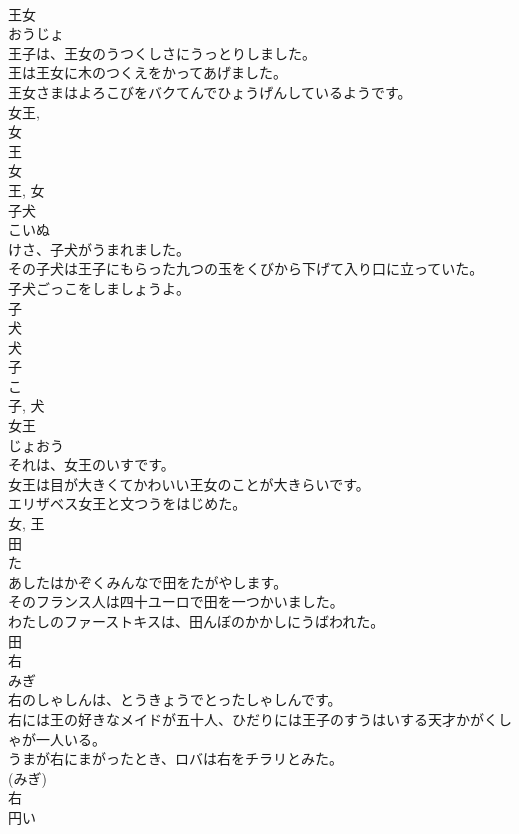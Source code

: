 \documentclass[8pt]{extreport}
\begin{document}
\begin{CJK}{UTF8}{min}
\\	王女	
\\	おうじょ	
\\	王子は、王女のうつくしさにうっとりしました。	
\\	王は王女に木のつくえをかってあげました。	
\\	王女さまはよろこびをバクてんでひょうげんしているようです。	
\\	女王, 
\\	女 
\\	王 
\\	女 
\\	王, 女	
\\	子犬	
\\	こいぬ	
\\	けさ、子犬がうまれました。	
\\	その子犬は王子にもらった九つの玉をくびから下げて入り口に立っていた。	
\\	子犬ごっこをしましょうよ。	
\\	子 
\\	犬 
\\	犬 
\\	子 
\\	こ 
\\	子, 犬	
\\	女王	
\\	じょおう	
\\	それは、女王のいすです。	
\\	女王は目が大きくてかわいい王女のことが大きらいです。	
\\	エリザベス女王と文つうをはじめた。	
\\	女, 王	
\\	田	
\\	た	
\\	あしたはかぞくみんなで田をたがやします。	
\\	そのフランス人は四十ユーロで田を一つかいました。	
\\	わたしのファーストキスは、田んぼのかかしにうばわれた。	
\\	田	
\\	右	
\\	みぎ	
\\	右のしゃしんは、とうきょうでとったしゃしんです。	
\\	右には王の好きなメイドが五十人、ひだりには王子のすうはいする天才かがくしゃが一人いる。	
\\	うまが右にまがったとき、ロバは右をチラリとみた。	
\\	(みぎ) 
\\	右	
\\	円い	

\end{CJK}
\end{document}
